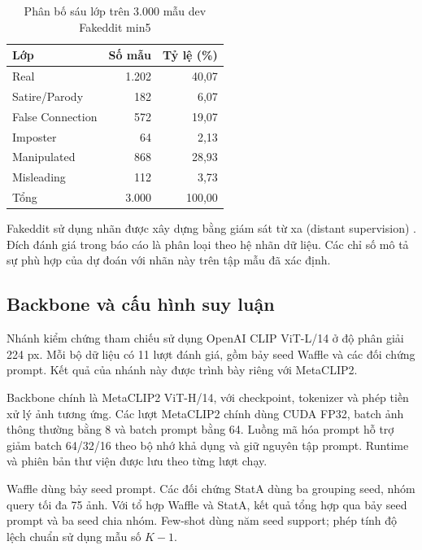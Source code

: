 \documentclass[12pt,a4paper]{article}
\newcommand{\BodySize}{13}
\newcommand{\BodyLeading}{15.6}
\newcommand{\BodyFont}{\fontsize{\BodySize}{\BodyLeading}\selectfont}
\numberwithin{figure}{section}
\numberwithin{table}{section}
\numberwithin{equation}{section}
\begin{document}
\begin{table}[H]\centering\BodyFont
\caption{Phân bố sáu lớp trên 3.000 mẫu dev Fakeddit min5}
\begin{tabularx}{\linewidth}{@{}Lrr@{}}\toprule
Lớp & Số mẫu & Tỷ lệ (\%)\\\midrule
Real & 1.202 & 40,07\\
Satire/Parody & 182 & 6,07\\
False Connection & 572 & 19,07\\
Imposter & 64 & 2,13\\
Manipulated & 868 & 28,93\\
Misleading & 112 & 3,73\\\midrule
Tổng & 3.000 & 100,00\\\bottomrule
\end{tabularx}\label{tab:class-counts}
\end{table}
Fakeddit sử dụng nhãn được xây dựng bằng giám sát từ xa (distant supervision) \cite{fakeddit}. Đích đánh giá trong báo cáo là phân loại theo hệ nhãn dữ liệu. Các chỉ số mô tả sự phù hợp của dự đoán với nhãn này trên tập mẫu đã xác định.

\subsection{Backbone và cấu hình suy luận}
Nhánh kiểm chứng tham chiếu sử dụng OpenAI CLIP ViT-L/14 ở độ phân giải 224 px. Mỗi bộ dữ liệu có 11 lượt đánh giá, gồm bảy seed Waffle và các đối chứng prompt. Kết quả của nhánh này được trình bày riêng với MetaCLIP2.

Backbone chính là MetaCLIP2 ViT-H/14, với checkpoint, tokenizer và phép tiền xử lý ảnh tương ứng. Các lượt MetaCLIP2 chính dùng CUDA FP32, batch ảnh thông thường bằng 8 và batch prompt bằng 64. Luồng mã hóa prompt hỗ trợ giảm batch 64/32/16 theo bộ nhớ khả dụng và giữ nguyên tập prompt. Runtime và phiên bản thư viện được lưu theo từng lượt chạy.

Waffle dùng bảy seed prompt. Các đối chứng StatA dùng ba grouping seed, nhóm query tối đa 75 ảnh. Với tổ hợp Waffle và StatA, kết quả tổng hợp qua bảy seed prompt và ba seed chia nhóm. Few-shot dùng năm seed support; phép tính độ lệch chuẩn sử dụng mẫu số $K-1$.
\end{document}
